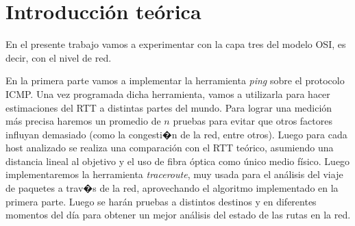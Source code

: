 \section{Introducción teórica}

En el presente trabajo vamos a experimentar con la capa tres del modelo OSI,
es decir, con el nivel de red.

En la primera parte vamos a implementar la herramienta \textit{ping} sobre el protocolo
ICMP. Una vez programada dicha herramienta, vamos a utilizarla para hacer
estimaciones del RTT a distintas partes del mundo. Para lograr una medición
más precisa haremos un promedio de $n$ pruebas para evitar que otros factores
influyan demasiado (como la congesti�n de la red, entre otros). Luego para
cada host analizado se realiza una comparación con el RTT teórico, asumiendo
una distancia lineal al objetivo y el uso de fibra óptica como único medio
físico.
Luego implementaremos la herramienta \textit{traceroute}, muy usada
para el análisis del viaje de paquetes a trav�s de la red, aprovechando el
algoritmo implementado en la primera parte. Luego se harán pruebas a distintos
destinos y en diferentes momentos del día para obtener un mejor análisis del
estado de las rutas en la red.
